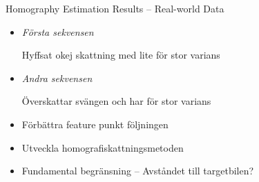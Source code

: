\documentclass{beamer}
\renewcommand{\a}{\r{a}\xspace}
\renewcommand{\aa}{\"a\xspace}
\renewcommand{\o}{\"o\xspace}
\begin{document}
\begin{frame}{Homography Estimation Results -- Real-world Data}
	\note
	{
		\begin{itemize}
			\item \textit{F\o{}rsta sekvensen}

			Hyffsat okej skattning med lite f\o{}r stor varians

			\item \textit{Andra sekvensen}

			\"Overskattar sv\aa{}ngen och har f\o{}r stor varians

			\vspace{2em}
			\item F\o{}rb\aa{}ttra feature punkt f\o{}ljningen
			\item Utveckla homografiskattningsmetoden
			\item Fundamental begr\aa{}nsning -- Avst\a{}ndet till targetbilen?
		\end{itemize}
	}
\end{frame}
\end{document}
